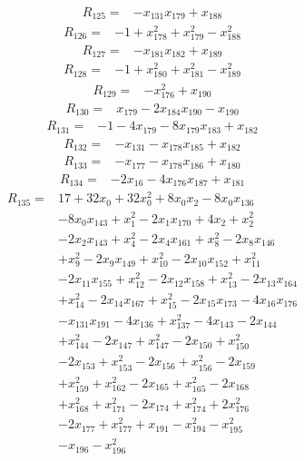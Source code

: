 \begin{align*} R_{125}={}&-x_{131}x_{179} +x_{188}
\end{align*}
\begin{align*} R_{126}={}&-1 +x_{178}^{2} +x_{179}^{2} -x_{188}^{2}
\end{align*}
\begin{align*} R_{127}={}&-x_{181}x_{182} +x_{189}
\end{align*}
\begin{align*} R_{128}={}&-1 +x_{180}^{2} +x_{181}^{2} -x_{189}^{2}
\end{align*}
\begin{align*} R_{129}={}&-x_{176}^{2} +x_{190}
\end{align*}
\begin{align*} R_{130}={}&x_{179} -2 x_{184}x_{190} -x_{190}
\end{align*}
\begin{align*} R_{131}={}&-1 -4 x_{179} -8 x_{179}x_{183} +x_{182}
\end{align*}
\begin{align*} R_{132}={}&-x_{131} -x_{178}x_{185} +x_{182}
\end{align*}
\begin{align*} R_{133}={}&-x_{177} -x_{178}x_{186} +x_{180}
\end{align*}
\begin{align*} R_{134}={}&-2 x_{16} -4 x_{176}x_{187} +x_{181}
\end{align*}
\begin{align*} R_{135}={}&17 +32 x_{0} +32 x_{0}^{2} +8 x_{0}x_{2} -8 x_{0}x_{136}
\\ &-8 x_{0}x_{143} +x_{1}^{2} -2 x_{1}x_{170} +4 x_{2} +x_{2}^{2}
\\ &-2 x_{2}x_{143} +x_{4}^{2} -2 x_{4}x_{161} +x_{8}^{2} -2 x_{8}x_{146}
\\ &+x_{9}^{2} -2 x_{9}x_{149} +x_{10}^{2} -2 x_{10}x_{152} +x_{11}^{2}
\\ &-2 x_{11}x_{155} +x_{12}^{2} -2 x_{12}x_{158} +x_{13}^{2} -2 x_{13}x_{164}
\\ &+x_{14}^{2} -2 x_{14}x_{167} +x_{15}^{2} -2 x_{15}x_{173} -4 x_{16}x_{176}
\\ &-x_{131}x_{191} -4 x_{136} +x_{137}^{2} -4 x_{143} -2 x_{144}
\\ &+x_{144}^{2} -2 x_{147} +x_{147}^{2} -2 x_{150} +x_{150}^{2}
\\ &-2 x_{153} +x_{153}^{2} -2 x_{156} +x_{156}^{2} -2 x_{159}
\\ &+x_{159}^{2} +x_{162}^{2} -2 x_{165} +x_{165}^{2} -2 x_{168}
\\ &+x_{168}^{2} +x_{171}^{2} -2 x_{174} +x_{174}^{2} +2 x_{176}^{2}
\\ &-2 x_{177} +x_{177}^{2} +x_{191} -x_{194}^{2} -x_{195}^{2}
\\ &-x_{196} -x_{196}^{2}
\end{align*}
